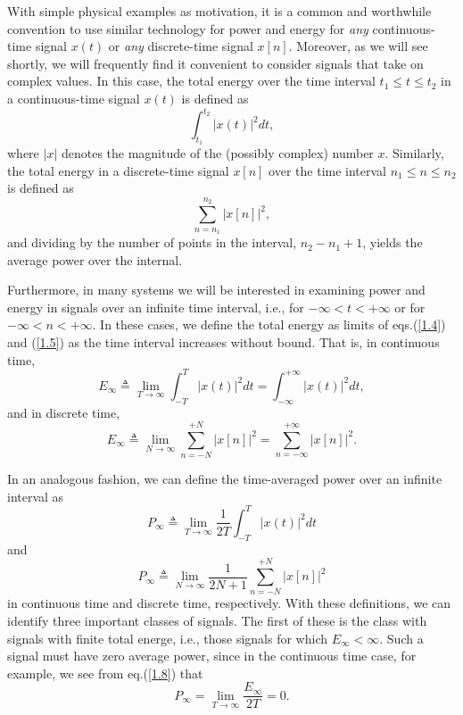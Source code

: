 \documentclass[a4paper,twoside]{book}
\begin{document}
With simple physical examples as motivation, it is a common and worthwhile convention to use similar technology for power and energy for \textit{any} continuous-time signal $x(t)$ or \textit{any} discrete-time signal $x[n]$. Moreover, as we will see shortly, we will frequently find it convenient to consider signals that take on complex values. In this case, the total energy over the time interval $t_1\le t\le t_2$ in a continuous-time signal $x(t)$ is defined as
\begin{equation}
    \int_{t_{1}}^{t_{2}}|x(t)|^{2}dt,
    \label{1.4}
\end{equation}
where $|x|$ denotes the magnitude of the (possibly complex) number $x$. Similarly, the total energy in a discrete-time signal $x[n]$ over the time interval $n_1\le n\le n_2$ is defined as
\begin{equation}
    \sum_{n=n_{1}}^{n_{2}}|x[n]|^{2},
    \label{1.5}
\end{equation}
and dividing by the number of points in the interval, $n_2-n_1+1$, yields the average power over the internal.

Furthermore, in many systems we will be interested in examining power and energy in signals over an infinite time interval, i.e., for $-\infty<t<+\infty$ or for $-\infty<n<+\infty$. In these cases, we define the total energy as limits of eqs.\;(\ref{1.4}) and (\ref{1.5}) as the time interval increases without bound. That is, in continuous time,
\begin{equation}
    E_{\infty}\triangleq\lim_{T\to\infty}\int_{-T}^{T}|x(t)|^{2}dt = \int_{-\infty}^{+\infty}|x(t)|^{2}dt,
    \label{1.6}
\end{equation}
and in discrete time,
\begin{equation}
    E_{\infty}\triangleq\lim_{N\to\infty}\sum_{n=-N}^{+N}|x[n]|^{2} = \sum_{n=-\infty}^{+\infty}|x[n]|^{2}.
    \label{1.7}
\end{equation}

In an analogous fashion, we can define the time-averaged power over an infinite interval as
\begin{equation}
    P_{\infty}\triangleq\lim_{T\to\infty}\frac{1}{2T}\int_{-T}^{T}|x(t)|^{2} dt
    \label{1.8}
\end{equation}
and
\begin{equation}
    P_{\infty}\triangleq\lim_{N\to\infty}\frac{1}{2N+1}\sum_{n=-N}^{+N}|x[n]|^{2}
    \label{1.9}
\end{equation}
in continuous time and discrete time, respectively. With these definitions, we can identify three important classes of signals. The first of these is the class with signals with finite total energe, i.e., those signals for which $E_{\infty}<\infty$. Such a signal must have zero average power, since in the continuous time case, for example, we see from eq.\;(\ref{1.8}) that
\begin{equation}
    P_{\infty}=\lim_{T\to\infty}\frac{E_{\infty}}{2T} = 0.
    \label{1.10}
\end{equation}
\end{document}
